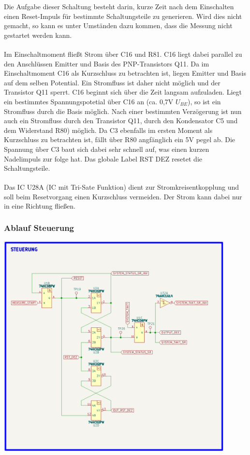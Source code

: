 Die Aufgabe dieser Schaltung besteht darin, kurze Zeit nach dem Einschalten einen Reset-Impuls für bestimmte Schaltungsteile zu generieren. Wird dies nicht gemacht, so kann es unter Umständen dazu kommen, dass die Messung nicht gestartet werden kann.
\\
\\
Im Einschaltmoment fließt Strom über C16 und R81. C16 liegt dabei parallel zu den Anschlüssen \glqq Emitter und Basis\grqq{} des PNP-Transistors Q11. Da im Einschaltmoment C16 als Kurzschluss zu betrachten ist, liegen Emitter und Basis auf dem selben Potential. Ein Stromfluss ist daher nicht möglich und der Transistor Q11 sperrt. C16 beginnt sich über die Zeit langsam aufzuladen. Liegt ein bestimmtes Spannungspotetial über C16 an (ca. 0,7V $U_{BE}$), so ist ein Stromfluss durch die Basis möglich. Nach einer bestimmten Verzögerung ist nun auch ein Stromfluss durch den Transistor Q11, durch den Kondensator C5 und dem Widerstand R80) möglich. Da C3 ebenfalls im ersten Moment als Kurzschluss zu betrachten ist, fällt über R80 angfänglich ein 5V pegel ab. Die Spannung über C3 baut sich dabei sehr schnell auf, was einen kurzen Nadelimpuls zur folge hat. Das globale Label \glqq RST DEZ\grqq{} resetet die Schaltungsteile.  
\\
\\
Das IC U28A (IC mit Tri-Sate Funktion) dient zur Stromkreisentkopplung und soll beim Resetvorgang einen Kurzschluss vermeiden. Der Strom kann dabei nur in eine Richtung fließen.

\newpage
\subsubsection{Ablauf Steuerung}

\begin{center}
\includegraphics[width=12cm]{Bilder/Controlling.png}
\end{center}

